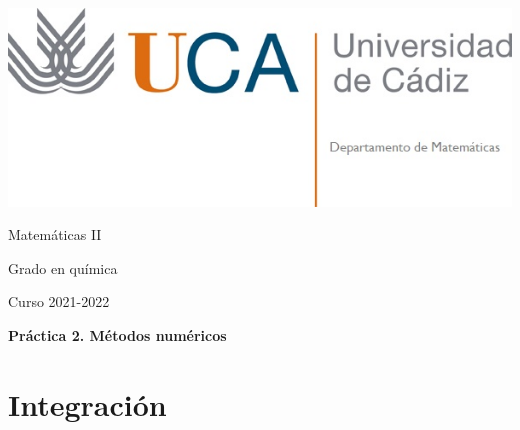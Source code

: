 \documentclass{article}
\title{}
\author{}
\date{}
\begin{document}
\begin{minipage}{.4\textwidth}
	\includegraphics[width=\linewidth]{uca.jpg}
\end{minipage}
%
\begin{minipage}{.6\textwidth}
	\begin{flushright}
		{\Large Matemáticas II}

		\medskip
		{\large Grado en química}

		\medskip
		Curso 2021-2022
	\end{flushright}
\end{minipage}

\medskip
\textbf{\Large Práctica 2. Métodos numéricos}

\section{Integración}

\end{document}
